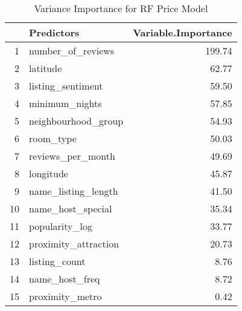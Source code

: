 \begin{table}[ht]
\centering
\begin{tabular}{rlr}
  \hline
 & Predictors & Variable.Importance \\ 
  \hline
1 & number\_of\_reviews & 199.74 \\ 
  2 & latitude & 62.77 \\ 
  3 & listing\_sentiment & 59.50 \\ 
  4 & minimum\_nights & 57.85 \\ 
  5 & neighbourhood\_group & 54.93 \\ 
  6 & room\_type & 50.03 \\ 
  7 & reviews\_per\_month & 49.69 \\ 
  8 & longitude & 45.87 \\ 
  9 & name\_listing\_length & 41.50 \\ 
  10 & name\_host\_special & 35.34 \\ 
  11 & popularity\_log & 33.77 \\ 
  12 & proximity\_attraction & 20.73 \\ 
  13 & listing\_count & 8.76 \\ 
  14 & name\_host\_freq & 8.72 \\ 
  15 & proximity\_metro & 0.42 \\ 
   \hline
\end{tabular}
\caption{Variance Importance for RF Price Model} 
\end{table}
